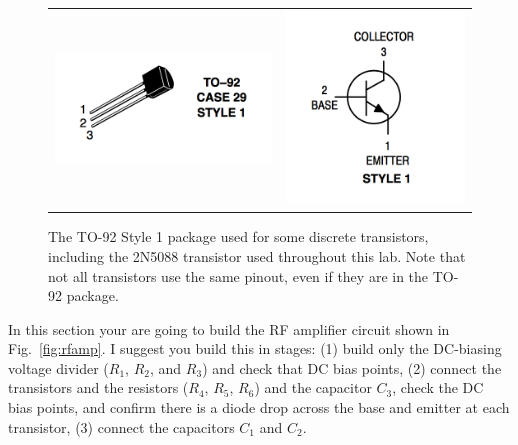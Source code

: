 \documentclass[12pt]{article}
\begin{document}
\begin{figure}[htbp]
\begin{center}
\begin{tabular}{c@{\hskip 2cm}c}
\includegraphics[height=0.10\textheight]{figs/case3904.png} &
\includegraphics[height=0.18\textheight]{figs/chan3904.png} \\
\end{tabular}
\end{center}
\caption{The TO-92 Style 1 package used for some discrete transistors, including the 2N5088 transistor used throughout this lab.  Note that not all transistors use the same pinout, even if they are in the TO-92 package.}
\label{fig:layout}
\end{figure}

In this section your are going to build the RF amplifier circuit shown in Fig.~\ref{fig:rfamp}.  I suggest you build this in stages:  (1) build only the DC-biasing voltage divider ($R_1$, $R_2$, and $R_3$) and check that DC bias points, (2) connect the transistors and the resistors ($R_4$, $R_5$, $R_6$) and the capacitor $C_3$, check the DC bias points, and confirm there is a diode drop across the base and emitter at each transistor, (3) connect the capacitors $C_1$ and $C_2$.  
\end{document}

